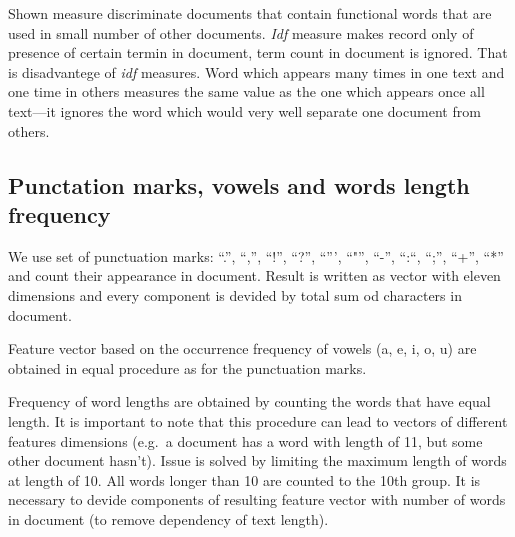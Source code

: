 \documentclass[11pt,english]{article}
\begin{document}
\begin{multicols}{2}
Shown measure discriminate documents that contain functional words that are
used in small number of other documents. \emph{Idf} measure makes record only
of presence of certain termin in document, term count in document is ignored.
That is disadvantege of \emph{idf} measures. Word which appears many times in one
text and one time in others measures the same value as the one which appears
once all text---it ignores the word which would very well separate one
document from others.

\subsection{Punctation marks, vowels and words length frequency}
\label{sec:znacajke-manje}
We use set of punctuation marks: ``.'', ``,'', ``!'', ``?'', ``''',
``"'', ``-'', ``:``, ``;'', ``+'', ``*'' and count their appearance in document.
Result is written as vector with eleven dimensions and every component is devided
by total sum od characters in document.

Feature vector based on the occurrence frequency of vowels (a, e, i, o, u) are
obtained in equal procedure as for the punctuation marks.

Frequency of word lengths are obtained by counting the words that have equal
length. It is important to note that this procedure can lead to vectors of
different features dimensions (e.g.\ a document has a word with length of 11,
but some other document hasn't). Issue is solved by limiting the maximum length
of words at length of 10. All words longer than 10 are counted to
the 10th group. It is necessary to devide components of resulting feature
vector with number of words in document (to remove dependency of text length).


\end{multicols}
\end{document}
